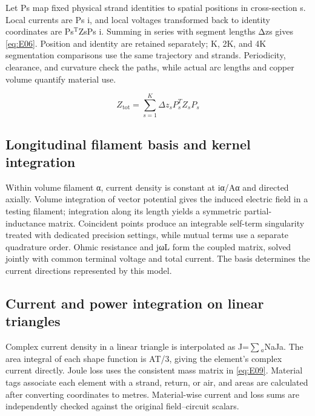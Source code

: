 \hypertarget{S1.dtm_derivation.p1}{}
Let Ps map fixed physical strand identities to spatial positions in cross-section s. Local currents are Ps i, and local voltages transformed back to identity coordinates are Ps\(^{\mathrm T}\)ZsPs i. Summing in series with segment lengths Δzs gives \eqref{eq:E06}. Position and identity are retained separately; K, 2K, and 4K segmentation comparisons use the same trajectory and strands. Periodicity, clearance, and curvature check the paths, while actual arc lengths and copper volume quantify material use.

\hypertarget{S1.equation.E06}{}
\hypertarget{E06}{}\begin{equation}Z_{\mathrm{tot}}=\sum_{s=1}^{K}\Delta z_s P_s^T Z_s P_s\tag{7}\label{eq:E06}\end{equation}

\hypertarget{S1.peec_derivation.heading}{}
\subsection{Longitudinal filament basis and kernel integration}

\hypertarget{S1.peec_derivation.p1}{}
Within volume filament α, current density is constant at iα/Aα and directed axially. Volume integration of vector potential gives the induced electric field in a testing filament; integration along its length yields a symmetric partial-inductance matrix. Coincident points produce an integrable self-term singularity treated with dedicated precision settings, while mutual terms use a separate quadrature order. Ohmic resistance and jωL form the coupled matrix, solved jointly with common terminal voltage and total current. The basis determines the current directions represented by this model.

\hypertarget{S1.triangle_derivation.heading}{}
\subsection{Current and power integration on linear triangles}

\hypertarget{S1.triangle_derivation.p1}{}
Complex current density in a linear triangle is interpolated as J=\(\sum\)\(_a\)NaJa. The area integral of each shape function is AT/3, giving the element's complex current directly. Joule loss uses the consistent mass matrix in \eqref{eq:E09}. Material tags associate each element with a strand, return, or air, and areas are calculated after converting coordinates to metres. Material-wise current and loss sums are independently checked against the original field–circuit scalars.

